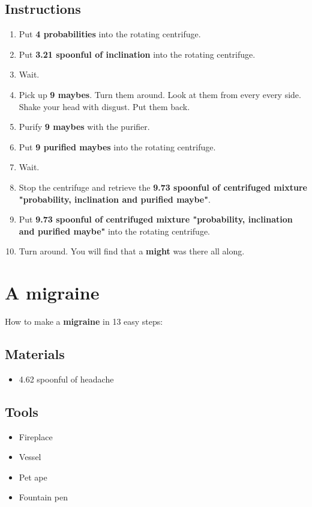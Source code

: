 \documentclass{article}
\begin{document}
\subsection{Instructions}\begin{enumerate}
\item 
Put \textbf{4 probabilities} into the rotating centrifuge.
\item 
Put \textbf{3.21 spoonful of inclination} into the rotating centrifuge.
\item 
Wait.
\item 
Pick up \textbf{9 maybes}. Turn them around. Look at them from every every side. Shake your head with disgust. Put them back.
\item 
Purify \textbf{9 maybes} with the purifier.
\item 
Put \textbf{9 purified maybes} into the rotating centrifuge.
\item 
Wait.
\item 
Stop the centrifuge and retrieve the \textbf{9.73 spoonful of centrifuged mixture "probability, inclination and purified maybe"}.
\item 
Put \textbf{9.73 spoonful of centrifuged mixture "probability, inclination and purified maybe"} into the rotating centrifuge.
\item 
Turn around. You will find that a \textbf{might} was there all along.
\end{enumerate}
\newpage
\section{A migraine}How to make a \textbf{migraine} in 13 easy steps:

\subsection{Materials}\begin{itemize}
\item 
4.62 spoonful of headache
\end{itemize}
\subsection{Tools}\begin{itemize}
\item 
Fireplace
\item 
Vessel
\item 
Pet ape
\item 
Fountain pen
\end{itemize}
\end{document}
